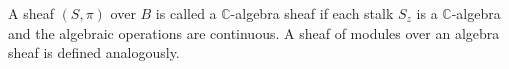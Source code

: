 A sheaf $(S, \pi)$ over $B$ is called a $\mathbb{C}$-algebra sheaf if each stalk $S_z$ is a $\mathbb{C}$-algebra and the algebraic operations are continuous. A sheaf of modules over an algebra sheaf is defined analogously.
